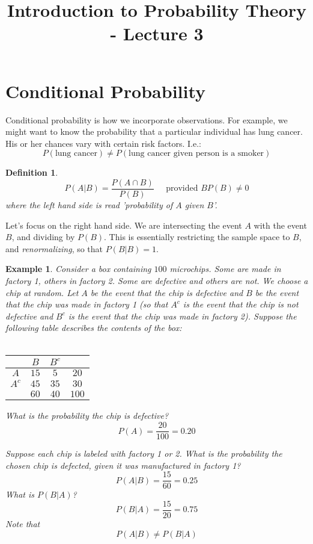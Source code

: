 \documentclass[12pt]{article} %
\title{Introduction to Probability Theory - Lecture 3}
\newtheorem{defn}{Definition}
\newtheorem{example}{Example}
\begin{document}
\maketitle
\section{Conditional Probability}
Conditional probability is how we incorporate observations. For example, we might want to know the probability that a particular individual has lung cancer. His or her chances vary with certain risk factors. I.e.:
$$P(\textrm{lung cancer})\neq P(\textrm{lung cancer given person is a smoker})$$
\begin{defn}
$$P(A|B) = \frac{P(A\cap B)}{P(B)} \;\;\;\;\;\textrm{provided }BP(B)\neq 0$$
where the left hand side is read 'probability of $A$ given $B$'. 
\end{defn}
Let's focus on the right hand side. We are intersecting the event $A$ with the event $B$, and dividing by $P(B)$. This is essentially restricting the sample space to $B$, and \emph{renormalizing}, so that $P(B|B) = 1$.
\begin{example}
Consider a box containing $100$ microchips. Some are made in factory 1, others in factory 2. Some are defective and others are not. We choose a chip at random. Let $A$ be the event that the chip is defective and $B$ be the event that the chip was made in factory 1 (so that $A^c$ is the event that the chip is not defective and $B^c$ is the event that the chip was made in factory 2). Suppose the following table describes the contents of the box:\\\\
\begin{tabular}{c|c c|c}
& $B$ & $B^c$& \\
\hline
$A$& $15$& $5$ &$20$\\
$A^c$& $45$ & $35$ &$30$\\
\hline
& $60$ & $40$ & $100$
\end{tabular}

What is the probability the chip is defective?
$$P(A) = \frac{20}{100} = 0.20$$

Suppose each chip is labeled with factory 1 or 2. What is the probability the chosen chip is defected, given it was manufactured in factory 1?
$$P(A|B) = \frac{15}{60} = 0.25$$
What is $P(B|A)$?
$$P(B|A) = \frac{15}{20} = 0.75$$
Note that
$$P(A|B) \neq P(B|A)$$
\end{example}
\end{document}
